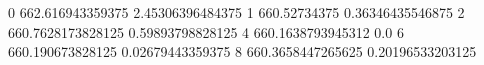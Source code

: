 0 662.616943359375 2.45306396484375
1 660.52734375 0.36346435546875
2 660.7628173828125 0.59893798828125
4 660.1638793945312 0.0
6 660.190673828125 0.02679443359375
8 660.3658447265625 0.20196533203125

